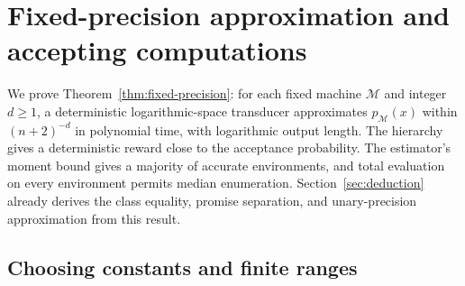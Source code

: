 \section{Fixed-precision approximation and accepting computations}
\label{sec:conclusion}

We prove Theorem~\ref{thm:fixed-precision}: for each fixed machine
$\mathcal M$ and integer $d\ge1$, a deterministic logarithmic-space
transducer approximates $p_{\mathcal M}(x)$ within $(n+2)^{-d}$ in
polynomial time, with logarithmic output length. The hierarchy gives
a deterministic reward close to the acceptance probability. The
estimator's moment bound gives a majority of accurate environments,
and total evaluation on every environment permits median enumeration.
Section~\ref{sec:deduction} already derives the class equality, promise
separation, and unary-precision approximation from this result.

\subsection{Choosing constants and finite ranges}
\label{subsec:final-constants}

